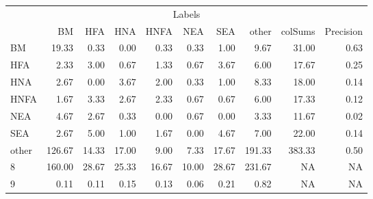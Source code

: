 \begin{table}
\centering\begingroup\fontsize{11}{13}\selectfont

\begin{tabular}{lrrrrrr>{}r|rr}
\toprule
\multicolumn{10}{c}{Labels} \\
\cmidrule(l{3pt}r{3pt}){1-10}
  & BM & HFA & HNA & HNFA & NEA & SEA & other & colSums & Precision\\
\midrule
BM & 19.33 & 0.33 & 0.00 & 0.33 & 0.33 & 1.00 & 9.67 & 31.00 & 0.63\\
HFA & 2.33 & 3.00 & 0.67 & 1.33 & 0.67 & 3.67 & 6.00 & 17.67 & 0.25\\
HNA & 2.67 & 0.00 & 3.67 & 2.00 & 0.33 & 1.00 & 8.33 & 18.00 & 0.14\\
HNFA & 1.67 & 3.33 & 2.67 & 2.33 & 0.67 & 0.67 & 6.00 & 17.33 & 0.12\\
NEA & 4.67 & 2.67 & 0.33 & 0.00 & 0.67 & 0.00 & 3.33 & 11.67 & 0.02\\
\addlinespace
SEA & 2.67 & 5.00 & 1.00 & 1.67 & 0.00 & 4.67 & 7.00 & 22.00 & 0.14\\
other & 126.67 & 14.33 & 17.00 & 9.00 & 7.33 & 17.67 & 191.33 & 383.33 & 0.50\\
8 & 160.00 & 28.67 & 25.33 & 16.67 & 10.00 & 28.67 & 231.67 & NA & NA\\
9 & 0.11 & 0.11 & 0.15 & 0.13 & 0.06 & 0.21 & 0.82 & NA & NA\\
\bottomrule
\end{tabular}
\endgroup{}
\end{table}
